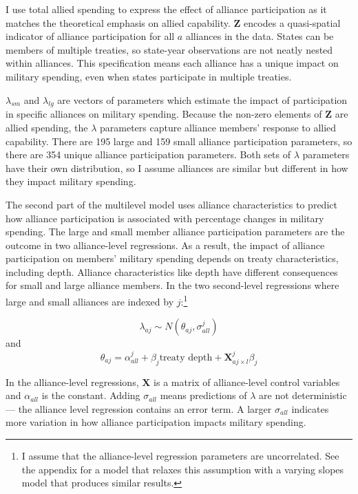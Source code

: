 \documentclass[12pt]{article}
\begin{document}
I use total allied spending to express the effect of alliance participation as it matches the theoretical emphasis on allied capability. 
$\textbf{Z}$ encodes a quasi-spatial indicator of alliance participation for all $a$ alliances in the data. 
States can be members of multiple treaties, so state-year observations are not neatly nested within alliances. 
This specification means each alliance has a unique impact on military spending, even when states participate in multiple treaties. 


$\lambda_{sm}$ and $\lambda_{lg}$ are vectors of parameters which estimate the impact of participation in specific alliances on military spending. 
Because the non-zero elements of $\textbf{Z}$ are allied spending, the $\lambda$ parameters capture alliance members' response to allied capability. 
There are 195 large and 159 small alliance participation parameters, so there are 354 unique alliance participation parameters. 
Both sets of $\lambda$ parameters have their own distribution, so I assume alliances are similar but different in how they impact military spending. 


The second part of the multilevel model uses alliance characteristics to predict how alliance participation is associated with percentage changes in military spending. 
The large and small member alliance participation parameters are the outcome in two alliance-level regressions.
As a result, the impact of alliance participation on members' military spending depends on treaty characteristics, including depth. 
Alliance characteristics like depth have different consequences for small and large alliance members. 
In the two second-level regressions where large and small alliances are indexed by $j$:\footnote{I assume that the alliance-level regression parameters are uncorrelated. See the appendix for a model that relaxes this assumption with a varying slopes model that produces similar results.}


\begin{equation}
\lambda_{aj} \sim N(\theta_{aj}, \sigma^{j}_{all})
\end{equation} 
and 
\begin{equation}
\theta_{aj} = \alpha^{j}_{all} + \beta_{j} \mbox{treaty depth} + \textbf{X}^{j}_{aj \times l} \beta_{j}
\end{equation}


In the alliance-level regressions, $\textbf{X}$ is a matrix of alliance-level control variables and $\alpha_{all}$ is the constant.
Adding $\sigma_{all}$ means predictions of $\lambda$ are not deterministic--- the alliance level regression contains an error term. 
A larger $\sigma_{all}$ indicates more variation in how alliance participation impacts military spending. 
\end{document}
